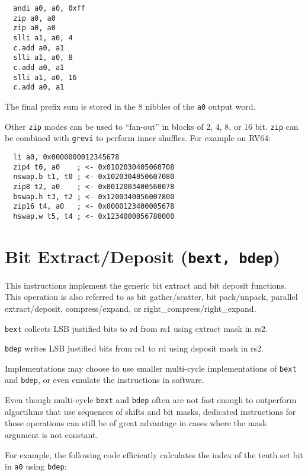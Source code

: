 \begin{verbatim}
  andi a0, a0, 0xff
  zip a0, a0
  zip a0, a0
  slli a1, a0, 4
  c.add a0, a1
  slli a1, a0, 8
  c.add a0, a1
  slli a1, a0, 16
  c.add a0, a1
\end{verbatim}

The final prefix sum is stored in the 8 nibbles of the {\tt a0} output word.

Other {\tt zip} modes can be used to ``fan-out'' in blocks of 2, 4, 8, or 16 bit.
{\tt zip} can be combined with {\tt grevi} to perform inner shuffles. For example
on RV64:

\begin{verbatim}
  li a0, 0x0000000012345678
  zip4 t0, a0    ; <- 0x0102030405060708
  nswap.b t1, t0 ; <- 0x1020304050607080
  zip8 t2, a0    ; <- 0x0012003400560078
  bswap.h t3, t2 ; <- 0x1200340056007800
  zip16 t4, a0   ; <- 0x0000123400005678
  hswap.w t5, t4 ; <- 0x1234000056780000
\end{verbatim}




\section{Bit Extract/Deposit (\texttt{bext,\ bdep})}

This instructions implement the generic bit extract and bit deposit functions.
This operation is also referred to as bit gather/scatter, bit pack/unpack,
parallel extract/deposit, compress/expand, or right\_compress/right\_expand.

\texttt{bext} collects LSB justified bits to rd from rs1 using extract mask in rs2.

\texttt{bdep} writes LSB justified bits from rs1 to rd using deposit mask in rs2.



Implementations may choose to use smaller multi-cycle implementations of
\texttt{bext} and \texttt{bdep}, or even emulate the instructions in software.

Even though multi-cycle \texttt{bext} and \texttt{bdep} often are not fast
enough to outperform algortihms that use sequences of shifts and bit masks,
dedicated instructions for those operations can still be of great advantage in
cases where the mask argument is not constant.

For example, the following code efficiently calculates the index of the tenth
set bit in {\tt a0} using \texttt{bdep}:

